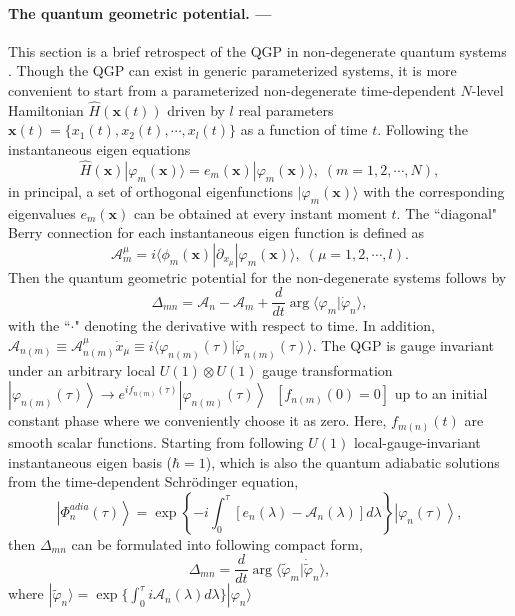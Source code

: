 \documentclass[aps,pra,twocolumn,
groupedaddress,10pt]{revtex4}
\def\be{\begin{equation}} \def\ee{\end{equation}}
\begin{document}
\paragraph*{The quantum geometric potential. ---}
This section is a brief retrospect of the QGP
in non-degenerate quantum systems \cite{Jianda2008,Zhang2010}.
Though the QGP can exist in generic parameterized systems,
it is more convenient to start from a parameterized non-degenerate
time-dependent $N$-level
Hamiltonian $\hat{H}(\textbf{x}(t))$ driven by $l$ real parameters
$\textbf{x}(t) = \{x_1(t), x_2(t),\cdots,x_l(t) \}$
as a function of time $t$.
Following the instantaneous eigen equations
\be
\hat{H}(\textbf{x})|\varphi_m(\textbf{x})\rangle =
e_m(\textbf{x})|\varphi_m(\textbf{x})\rangle,\; (m=1,2,\cdots,N),
\ee
in principal, a set of orthogonal eigenfunctions
$|\varphi_m(\textbf{x})\rangle$ with the corresponding
eigenvalues $e_m(\textbf{x})$ can be obtained at every instant moment $t$.
The ``diagonal" Berry connection for each instantaneous eigen function is defined as
\be
\mathcal{A}_{m}^{\mu}=i\langle\phi_m(\textbf{x})
|\partial_{x_\mu}|\varphi_m(\textbf{x})\rangle,\; (\mu = 1, 2, \cdots, l).
\ee
Then the quantum geometric potential for the non-degenerate systems
follows by
\be
\Delta_{mn} = \mathcal{A}_{n} - \mathcal{A}_{m} + \frac{d}{dt}\arg \langle\varphi_m|\dot{\varphi}_n\rangle,
\label{eq:ndqgp}
\ee
with the ``$\cdot$" denoting the derivative with respect to time.
In addition, $\mathcal{A}_{n(m)} \equiv \mathcal{A}_{n(m)}^{\mu}
\dot{x}_{\mu} \equiv i \langle\varphi_{n(m)}(\tau)|\dot{\varphi}_{n(m)}(\tau)\rangle$.
The QGP is gauge invariant under an arbitrary local $U(1)\otimes U(1)$ gauge transformation
$\left| {\varphi _{n(m)} (\tau )} \right\rangle  \to e^{if_{n(m)} (\tau )}
\left| {\varphi _{n(m)} (\tau )} \right\rangle \;\;\left[ {f_{n(m)} (0) = 0} \right]$
up to an initial constant phase where we conveniently choose it as zero.
Here, $f_{m(n)}(t)$ are smooth scalar functions. Starting from following
$U(1)$ local-gauge-invariant instantaneous eigen basis ($\hbar = 1$),
which is also the quantum adiabatic solutions from the time-dependent Schr\"odinger equation,
\be
\left| {\Phi _n^{adia} (\tau )} \right\rangle  = \exp \left\{ { - i\int_0^\tau  {\left[ {e_n (\lambda ) - \mathcal{A}_{n} (\lambda )} \right]d\lambda } } \right\}\left| {\varphi _n (\tau )} \right\rangle, \label{U1basis}
\ee
then $\Delta_{mn}$ can be formulated into following compact form,
\be
\Delta_{mn} = \frac{d}{dt}\arg \langle\tilde{\varphi}_m|\dot{\tilde{\varphi}}_n\rangle,
\label{QGP2}
\ee
where $|{\tilde{\varphi}}_n\rangle = \exp\{\int_0^\tau i \mathcal{A}_{n}(\lambda) d \lambda \} |\varphi_n\rangle$
\end{document}
